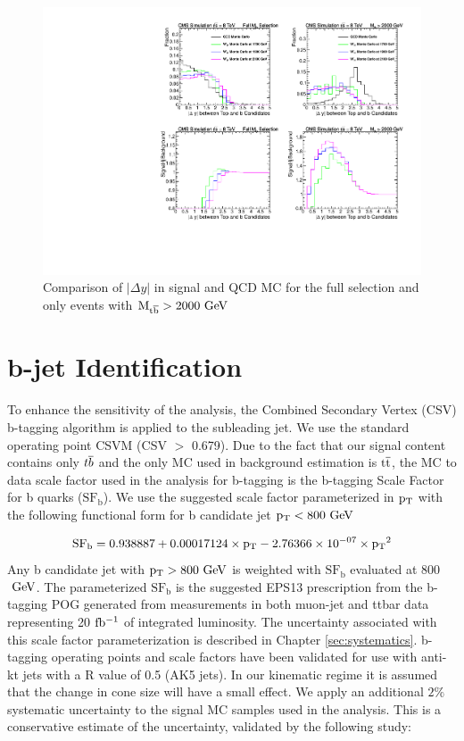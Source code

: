 \begin{figure}[htb]
\centering
\includegraphics[width=1.0\textwidth]{AN-13-004/figs/drapCompqcdandsignal}
\caption{Comparison of $|\Delta y|$ in signal and QCD MC for the full selection and only events with $\mathrm{M_{{t\overline{b}}}} > 2000~\mathrm{GeV}$}
\label{figs:CutComp}
\end{figure}



\section{b-jet Identification}
\label{sec:btagging}
To enhance the sensitivity of the analysis, the Combined Secondary Vertex (CSV) b-tagging algorithm is applied to the subleading jet. We use the standard operating point CSVM (CSV $>$ 0.679).
Due to the fact that our signal content 
contains only ${t\overline{b}}$ and the only MC used in background estimation is $\mathrm{t\overline{t}}$, the MC to data scale factor used in the analysis for b-tagging 
is the b-tagging Scale Factor for b quarks ($\mathrm{SF_b}$).  We use the suggested scale factor parameterized in $\mathrm{p_{T}}$ with the following functional form for 
b candidate jet $\mathrm{p_{T}} < 800~\mathrm{GeV}$

\begin{eqnarray}
\mathrm{SF_b = 0.938887 + 0.00017124\times \mathrm{p_{T}} - 2.76366 \times 10^{-07} \times \mathrm{p_{T}}^2} 
\end{eqnarray}
Any b candidate jet with $\mathrm{p_{T}} > 800~\mathrm{GeV}$ is weighted with $\mathrm{SF_b}$ evaluated at 800$~\mathrm{GeV}$.  The parameterized $\mathrm{SF_b}$ is the 
suggested EPS13 prescription \cite{CMS-PAS-BTV-13-001} from the b-tagging POG generated from measurements in both muon-jet and ttbar data representing 20$~\mathrm{fb^{-1}}$ of integrated 
luminosity. The uncertainty associated with this scale factor parameterization is described in Chapter \ref{sec:systematics}.  b-tagging operating points 
and scale factors have been validated for use with anti-kt jets with a R value of 0.5 (AK5 jets).  In our kinematic regime it is assumed that the change in cone size 
will have a small effect. We apply an additional $2\%$ systematic uncertainty to the signal MC samples used in the analysis. This is a conservative estimate of the uncertainty, validated by the following study: 

